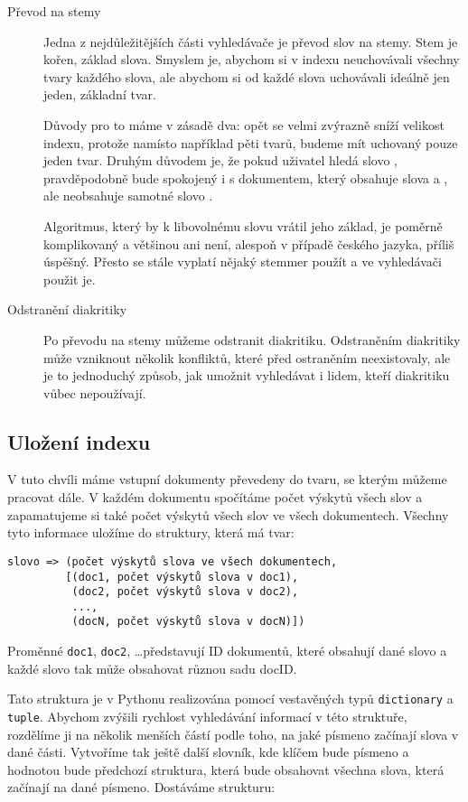 \documentclass[12pt]{article}
\newcommand{\code}[1]{\texttt{#1}}
\begin{document}
\begin{description}
\item[Převod na stemy] Jedna z nejdůležitějších části vyhledávače je převod slov na stemy. Stem je kořen, základ slova. Smyslem je, abychom si v indexu neuchovávali všechny tvary každého slova, ale abychom si od každé slova uchovávali ideálně jen jeden, základní tvar. 

Důvody pro to máme v zásadě dva: opět se velmi zvýrazně sníží velikost indexu, protože namísto například pěti tvarů, budeme mít uchovaný pouze jeden tvar. Druhým důvodem je, že pokud uživatel hledá slovo , pravděpodobně bude spokojený i s dokumentem, který obsahuje slova  a , ale neobsahuje samotné slovo . 

Algoritmus, který by k libovolnému slovu vrátil jeho základ, je poměrně komplikovaný a většinou ani není, alespoň v případě českého jazyka, příliš úspěšný. Přesto se stále vyplatí nějaký stemmer použít a ve vyhledávači použit je. 

\item[Odstranění diakritiky] Po převodu na stemy můžeme odstranit diakritiku. Odstraněním diakritiky může vzniknout několik konfliktů, které před ostraněním neexistovaly, ale je to jednoduchý způsob, jak umožnit vyhledávat i lidem, kteří diakritiku vůbec nepoužívají. 
\end{description} 


\subsection{Uložení indexu}
V tuto chvíli máme vstupní dokumenty převedeny do tvaru, se kterým můžeme pracovat dále. V každém dokumentu spočítáme počet výskytů všech slov a zapamatujeme si také počet výskytů všech slov ve všech dokumentech. Všechny tyto informace uložíme do struktury, která má tvar:

\begin{verbatim}
slovo => (počet výskytů slova ve všech dokumentech, 
         [(doc1, počet výskytů slova v doc1), 
          (doc2, počet výskytů slova v doc2), 
          ..., 
          (docN, počet výskytů slova v docN)])
\end{verbatim}

Proměnné \code{doc1}, \code{doc2}, \dots představují ID dokumentů, které obsahují dané slovo a každé slovo tak může obsahovat různou sadu docID. 

Tato struktura je v Pythonu realizována pomocí vestavěných typů \code{dictionary} a \code{tuple}. Abychom zvýšili rychlost vyhledávání informací v této struktuře, rozdělíme ji na několik menších částí podle toho, na jaké písmeno začínají slova v dané části. Vytvoříme tak ještě další slovník, kde klíčem bude písmeno a hodnotou bude předchozí struktura, která bude obsahovat všechna slova, která začínají na dané písmeno. Dostáváme strukturu:
\end{document}
